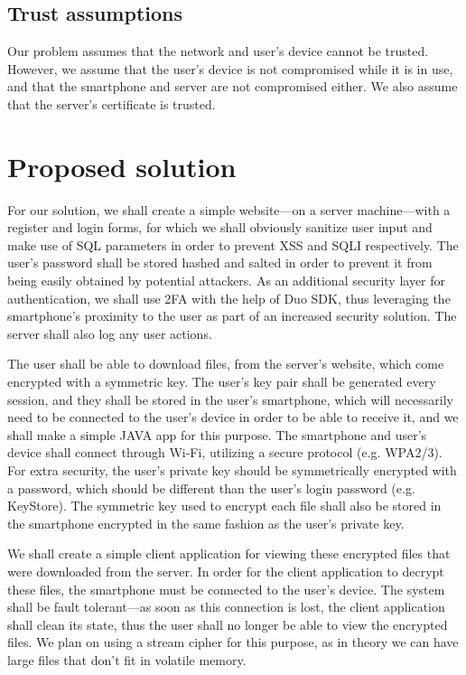 \documentclass[12pt]{article}
\begin{document}
\subsection{Trust assumptions}

Our problem assumes that the network and user's device cannot be trusted. However, we assume that the user's device is not compromised while it is in use, and that the smartphone and server are not compromised either. We also assume that the server's certificate is trusted.


\newpage
\section{Proposed solution}

For our solution, we shall create a simple website---on a server machine---with a register and login forms, for which we shall obviously sanitize user input and make use of SQL parameters in order to prevent XSS and SQLI respectively. The user's password shall be stored hashed and salted in order to prevent it from being easily obtained by potential attackers. As an additional security layer for authentication, we shall use 2FA with the help of Duo SDK, thus leveraging the smartphone's proximity to the user as part of an increased security solution. The server shall also log any user actions.\par

The user shall be able to download files, from the server's website, which come encrypted with a symmetric key. The user's key pair shall be generated every session, and they shall be stored in the user's smartphone, which will necessarily need to be connected to the user's device in order to be able to receive it, and we shall make a simple JAVA app for this purpose. The smartphone and user's device shall connect through Wi-Fi, utilizing a secure protocol (e.g. WPA2/3). For extra security, the user's private key should be symmetrically encrypted with a password, which should be different than the user's login password (e.g. KeyStore). The symmetric key used to encrypt each file shall also be stored in the smartphone encrypted in the same fashion as the user's private key.\par

We shall create a simple client application for viewing these encrypted files that were downloaded from the server. In order for the client application to decrypt these files, the smartphone must be connected to the user's device. The system shall be fault tolerant---as soon as this connection is lost, the client application shall clean its state, thus the user shall no longer be able to view the encrypted files. We plan on using a stream cipher for this purpose, as in theory we can have large files that don't fit in volatile memory.\par
\end{document}
